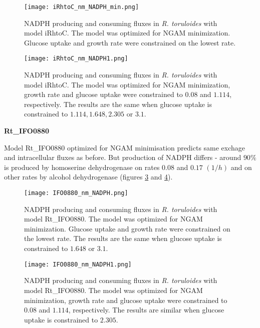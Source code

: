 \begin{figure}[H]
    \centering
    \texttt{[image: iRhtoC\_nm\_NADPH\_min.png]}
    \caption{NADPH producing and consuming fluxes in \textit{R. toruloides} with model iRhtoC. The model was optimized for NGAM minimization. 
    Glucose uptake and growth rate were constrained on the lowest rate.}
    \label{fig:iRhtoC_nm_NADPH_min}
\end{figure}
\begin{figure}[H]
    \centering
    \texttt{[image: iRhtoC\_nm\_NADPH1.png]}
    \caption{NADPH producing and consuming fluxes in \textit{R. toruloides} with model iRhtoC. The model was optimized for NGAM minimization, 
    growth rate and glucose uptake were constrained to $0.08$ and $1.114$, respectively. 
    The results are the same when glucose uptake is constrained to $1.114, 1.648, 2.305$ or $3.1$.}
    \label{fig:iRhtoC_nm_NADPH1}
\end{figure}



\textbf{Rt\_IFO0880}

Model Rt\_IFO0880 optimized for NGAM minimisation predicts same 
exchage and intracellular fluxes as before. But production of NADPH differs - around $90\%$ is produced by homoserine dehydrogenase 
on rates $0.08$ and $0.17$ $(1/h)$ and on other rates by alcohol dehydrogenase (figures \ref{fig:IFO0880_nm_NADPH} and \ref{fig:IFO0880_nm_NADPH1}). 

\begin{figure}[H]
    \centering
    \texttt{[image: IFO0880\_nm\_NADPH.png]}
    \caption{NADPH producing and consuming fluxes in \textit{R. toruloides} with model Rt\_IFO0880. The model was optimized for NGAM minimization. 
    Glucose uptake and growth rate were constrained on the lowest rate. The results are the same when glucose uptake is constrained to $1.648$ or $3.1$.}
    \label{fig:IFO0880_nm_NADPH}
\end{figure}
\begin{figure}[H]
    \centering
    \texttt{[image: IFO0880\_nm\_NADPH1.png]}
    \caption{NADPH producing and consuming fluxes in \textit{R. toruloides} with model Rt\_IFO0880. The model was optimized for NGAM minimization, 
    growth rate and glucose uptake were constrained to $0.0$8 and $1.114$, respectively. The results are similar when glucose uptake is constrained to $2.305$.}
    \label{fig:IFO0880_nm_NADPH1}
\end{figure}


